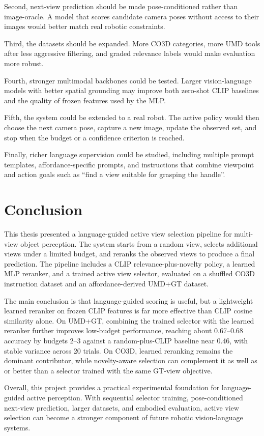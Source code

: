 Second, next-view prediction should be made pose-conditioned rather than image-oracle. A model that scores candidate camera poses without access to their images would better match real robotic constraints.

Third, the datasets should be expanded. More CO3D categories, more UMD tools after less aggressive filtering, and graded relevance labels would make evaluation more robust.

Fourth, stronger multimodal backbones could be tested. Larger vision-language models with better spatial grounding may improve both zero-shot CLIP baselines and the quality of frozen features used by the MLP.

Fifth, the system could be extended to a real robot. The active policy would then choose the next camera pose, capture a new image, update the observed set, and stop when the budget or a confidence criterion is reached.

Finally, richer language supervision could be studied, including multiple prompt templates, affordance-specific prompts, and instructions that combine viewpoint and action goals such as ``find a view suitable for grasping the handle''.

\section{Conclusion}

This thesis presented a language-guided active view selection pipeline for multi-view object perception. The system starts from a random view, selects additional views under a limited budget, and reranks the observed views to produce a final prediction. The pipeline includes a CLIP relevance-plus-novelty policy, a learned MLP reranker, and a trained active view selector, evaluated on a shuffled CO3D instruction dataset and an affordance-derived UMD+GT dataset.

The main conclusion is that language-guided scoring is useful, but a lightweight learned reranker on frozen CLIP features is far more effective than CLIP cosine similarity alone. On UMD+GT, combining the trained selector with the learned reranker further improves low-budget performance, reaching about 0.67--0.68 accuracy by budgets 2--3 against a random-plus-CLIP baseline near 0.46, with stable variance across 20 trials. On CO3D, learned reranking remains the dominant contributor, while novelty-aware selection can complement it as well as or better than a selector trained with the same GT-view objective.

Overall, this project provides a practical experimental foundation for language-guided active perception. With sequential selector training, pose-conditioned next-view prediction, larger datasets, and embodied evaluation, active view selection can become a stronger component of future robotic vision-language systems.
